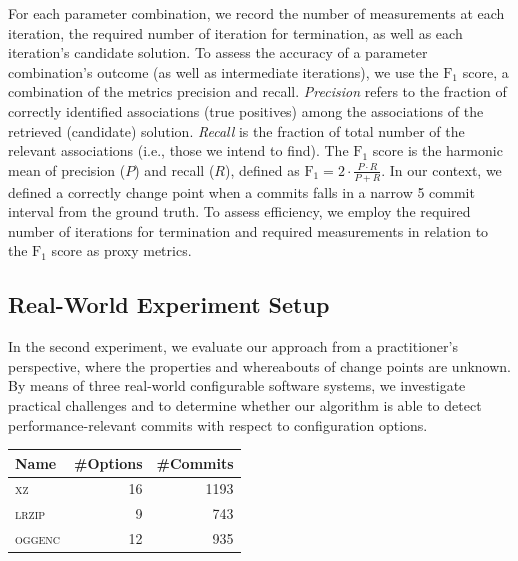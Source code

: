 \documentclass[sigconf]{acmart}
\begin{document}
	For each parameter combination, we record the number of measurements at each iteration, the required number of iteration for termination, as well as each iteration's candidate solution. To assess the accuracy of a parameter combination's outcome (as well as intermediate iterations), we use the $\text{F}_1$ score, a combination of the metrics precision and recall. \emph{Precision} refers to the fraction of correctly identified associations (true positives) among the associations of the retrieved (candidate) solution. \emph{Recall} is the fraction of total number of the relevant associations (i.e., those we intend to find). The $\text{F}_1$ score is the harmonic mean of precision ($P$) and recall ($R$), defined as $\text{F}_1 = 2\cdot\frac{P \cdot R}{P + R}$.	In our context, we defined a correctly change point when a commits falls in a narrow 5 commit interval from the ground truth.
	To assess efficiency, we employ the required number of iterations for termination and required measurements in relation to the $\text{F}_1$ score as proxy metrics.
	
	\subsection{Real-World Experiment Setup}
	In the second experiment, we evaluate our approach from a practitioner's perspective, where the properties and whereabouts of change points are unknown.  By means of three real-world configurable software systems, we investigate practical challenges and to determine whether our algorithm is able to detect performance-relevant commits with respect to configuration options. 

    \begin{table}
        \centering
        \label{tab:properties}
        \begin{tabular}{lrr}
			\toprule
			\textbf{Name} & \textbf{\#Options} & \textbf{\#Commits}\\
			\midrule
			\textsc{xz} & 16 & 1193\\
			\textsc{lrzip} & 9 & 743 \\
			\textsc{oggenc} & 12 & 935\\
			\bottomrule
		\end{tabular}
    \end{table}
\end{document}
